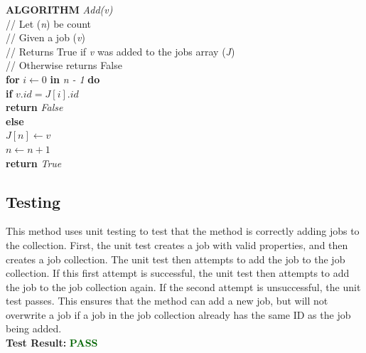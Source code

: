 \documentclass[12pt,a4paper]{article}
\begin{document}
			\textbf{ALGORITHM} \textit{Add(v)}\\
			\null\hspace{1cm}// Let (\textit{n}) be count\\
			\null\hspace{1cm}// Given a job (\textit{v})\\
			\null\hspace{1cm}// Returns True if \textit{v} was added to the jobs array (\textit{J})\\
			\null\hspace{1cm}// Otherwise returns False\\
			\null\hspace{1cm}\textbf{for} \textit{$i \gets 0$} \textbf{in} \textit{n - 1} \textbf{do}\\
			\null\hspace{2cm}\textbf{if} \textit{$v.id = J[i].id$}\\
			\null\hspace{3cm}\textbf{return} \textit{False}\\
			\null\hspace{1cm}\textbf{else}\\
			\null\hspace{2cm}\textit{$J[n] \gets v$}\\
			\null\hspace{2cm}\textit{$n \gets n + 1$}\\
			\null\hspace{2cm}\textbf{return} \textit{True}\\

		\subsection{Testing}
			This method uses unit testing to test that the method is correctly adding jobs to the 
			collection. First, the unit test creates a job with valid properties, and then creates 
			a job collection. The unit test then attempts to add the job to the job 
			collection. If this first attempt is successful, the unit test then attempts to add the 
			job to the job collection again. If the second attempt is unsuccessful, the unit test 
			passes. This ensures that the method can add a new job, but will not overwrite a job if a job in 
			the job collection already has the same ID as the job being added.\\

			\textbf{Test Result:} \textbf{\textcolor{darkgreen}{PASS}}\\
\end{document}
